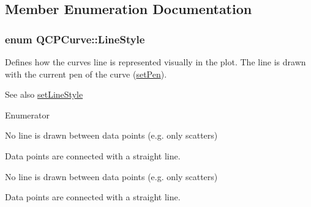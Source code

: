 \subsection{Member Enumeration Documentation}
\subsubsection[{\texorpdfstring{Line\+Style}{LineStyle}}]{\setlength{\rightskip}{0pt plus 5cm}enum {\bf Q\+C\+P\+Curve\+::\+Line\+Style}}\hypertarget{class_q_c_p_curve_a2710e9f79302152cff794c6e16cc01f1}{}\label{class_q_c_p_curve_a2710e9f79302152cff794c6e16cc01f1}
Defines how the curve\textquotesingle{}s line is represented visually in the plot. The line is drawn with the current pen of the curve (\hyperlink{class_q_c_p_abstract_plottable_ab74b09ae4c0e7e13142fe4b5bf46cac7}{set\+Pen}). \begin{DoxySeeAlso}{See also}
\hyperlink{class_q_c_p_curve_a4a377ec863ff81a1875c3094a6177c19}{set\+Line\+Style} 
\end{DoxySeeAlso}
\begin{Desc}
\item[Enumerator]\par
\begin{description}
\item[{\em 
ls\+None\hypertarget{class_q_c_p_curve_a2710e9f79302152cff794c6e16cc01f1a65deb77129bf07722cc01d54ddf0b6b7}{}\label{class_q_c_p_curve_a2710e9f79302152cff794c6e16cc01f1a65deb77129bf07722cc01d54ddf0b6b7}
}]No line is drawn between data points (e.\+g. only scatters) \item[{\em 
ls\+Line\hypertarget{class_q_c_p_curve_a2710e9f79302152cff794c6e16cc01f1abb5cbe337df27682d7674652057fdc58}{}\label{class_q_c_p_curve_a2710e9f79302152cff794c6e16cc01f1abb5cbe337df27682d7674652057fdc58}
}]Data points are connected with a straight line. \item[{\em 
ls\+None\hypertarget{class_q_c_p_curve_a2710e9f79302152cff794c6e16cc01f1a65deb77129bf07722cc01d54ddf0b6b7}{}\label{class_q_c_p_curve_a2710e9f79302152cff794c6e16cc01f1a65deb77129bf07722cc01d54ddf0b6b7}
}]No line is drawn between data points (e.\+g. only scatters) \item[{\em 
ls\+Line\hypertarget{class_q_c_p_curve_a2710e9f79302152cff794c6e16cc01f1abb5cbe337df27682d7674652057fdc58}{}\label{class_q_c_p_curve_a2710e9f79302152cff794c6e16cc01f1abb5cbe337df27682d7674652057fdc58}
}]Data points are connected with a straight line. \end{description}
\end{Desc}
